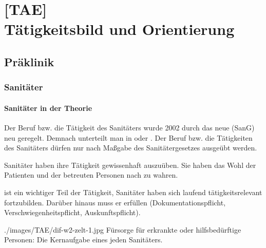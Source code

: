\chapter[{[TAE]} Tätigkeitsbild und Orientierung]{[TAE]\\Tätigkeitsbild und
Orientierung}
\label{chp:TAE}

\minitoc

\section{Präklinik}

\subsection{Sanitäter}

\subsubsection{Sanitäter in der Theorie}

Der Beruf bzw. die Tätigkeit des Sanitäters wurde 2002 durch das neue 
 (SanG) neu geregelt. Demnach unterteilt man in
 oder . Der Beruf bzw. die Tätigkeiten des Sanitäters dürfen nur nach Maßgabe des Sanitätergesetzes
 ausgeübt werden. 

Sanitäter haben ihre Tätigkeit  gewissenhaft
auszuüben. Sie haben das Wohl der Patienten und der betreuten Personen nach
zu wahren. 

 ist ein wichtiger Teil der Tätigkeit, Sanitäter haben sich
laufend tätigkeitsrelevant fortzubilden. Darüber hinaus muss er  erfüllen (Dokumentationspflicht, Verschwiegenheitspflicht,
Auskunftspflicht).


{}
{./images/TAE/dif-w2-zelt-1.jpg}
{Fürsorge für erkrankte oder
hilfsbedürftige Personen: Die Kernaufgabe eines jeden Sanitäters.}
{}


